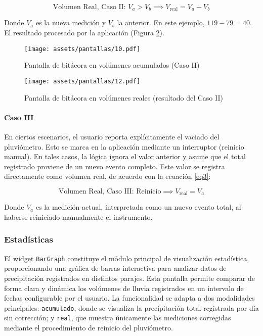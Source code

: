 \begin{equation}
\text{Volumen Real, Caso II: } V_{a} > V_{b} \implies V_{\text{real}} = V_{a} - V_{b}
\label{eq2}
\end{equation}

Donde $V_{a}$ es la nueva medición y $V_{b}$ la anterior. En este ejemplo, $119 - 79 = 40$. El resultado procesado por la aplicación (Figura \ref{pantallas12}).

\begin{figure}[h!]
\centering
\texttt{[image: assets/pantallas/10.pdf]}
\caption{Pantalla de bitácora en volúmenes acumulados (Caso II)}
\label{pantallas10}
\end{figure}

\begin{figure}[h!]
\centering
\texttt{[image: assets/pantallas/12.pdf]}
\caption{Pantalla de bitácora en volúmenes reales (resultado del Caso II)}
\label{pantallas12}
\end{figure}


\paragraph{Caso III}

En ciertos escenarios, el usuario reporta explícitamente el vaciado del pluviómetro. Esto se marca en la aplicación mediante un interruptor (reinicio manual). En tales casos, la lógica ignora el valor anterior y asume que el total registrado proviene de un nuevo evento completo. Este valor se registra directamente como volumen real, de acuerdo con la ecuación \ref{eq3}:

\begin{equation}
\text{Volumen Real, Caso III: Reinicio} \implies V_{\text{real}} = V_{a}
\label{eq3}
\end{equation}

Donde $V_{a}$ es la medición actual, interpretada como un nuevo evento total, al haberse reiniciado manualmente el instrumento.

\newpage
\subsubsection*{Estadísticas} 

El widget \texttt{BarGraph} constituye el módulo principal de visualización estadística, proporcionando una gráfica de barras interactiva para analizar datos de precipitación registrados en distintos parajes. Esta pantalla permite comparar de forma clara y dinámica los volúmenes de lluvia registrados en un intervalo de fechas configurable por el usuario. La funcionalidad se adapta a dos modalidades principales: \texttt{acumulado}, donde se visualiza la precipitación total registrada por día sin corrección; y \texttt{real}, que muestra únicamente las mediciones corregidas mediante el procedimiento de reinicio del pluviómetro. 

